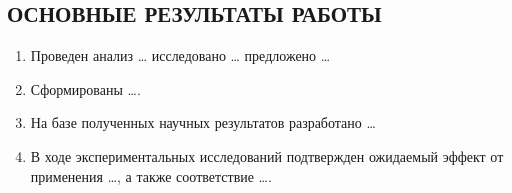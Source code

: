 
\subsection*{\MakeUppercase{Основные результаты работы}}

\begin{enumerate}

\item Проведен анализ \dots{} исследовано \dots{} предложено \dots{}

\item Сформированы \dots{}.

\item На базе полученных научных результатов разработано \dots{}

\item В ходе экспериментальных исследований подтвержден ожидаемый
  эффект от применения \dots{}, а также соответствие \dots{}.

\end{enumerate}